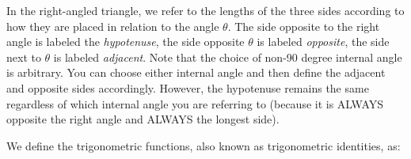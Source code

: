     \addtocounter{footnote}{-0}
    
      \par 
      \label{m39408*id79673}In the right-angled triangle, we refer to the lengths of the three sides according to how they are placed in relation to the angle \begin{math}\theta \end{math}. The side opposite to the right angle is labeled the \textsl{hypotenuse}, the side opposite \begin{math}\theta \end{math} is labeled \textsl{opposite}, the side next to \begin{math}\theta \end{math} is labeled \textsl{adjacent}. Note that the choice of non-90 degree internal angle is arbitrary. You can choose either internal angle and then define the adjacent and opposite sides accordingly. However, the hypotenuse remains the same regardless of which internal angle you are referring to (because it is ALWAYS opposite the right angle and ALWAYS the longest side).\par 
      \label{m39408*id79725}We define the trigonometric functions, also known as trigonometric identities, as:
\par 
      \label{m39408*uid21}\nopagebreak\noindent{}
